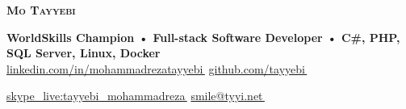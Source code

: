 \documentclass[11pt,a4paper]{article}
\let\orighref\href
\renewcommand{\href}[2]{\orighref{#1}{#2\,{\textsuperscript{\tiny{\faExternalLink}}}}}
\begin{document}

\begin{center}
    \textbf{\Huge \scshape Mo Tayyebi} \\ \vspace{5pt}

    \textbf{ WorldSkills Champion • Full-stack Software Developer • C\#, PHP, SQL Server, Linux, Docker } \\ \vspace{1pt}
    \small\href{https://www.linkedin.com/in/mohammadrezatayyebi/}{linkedin.com/in/mohammadrezatayyebi}
    \small\href{https://github.com/tayyebi}{github.com/tayyebi}
    
    \small\href{https://join.skype.com/invite/dCymvSYLJbfJ}{skype\_live:tayyebi\_mohammadreza}
    \small\href{mailto:tayyebimohammadreza+r@gmail.com}{smile@tyyi.net}
    
    
\end{center}
\end{document}
